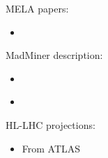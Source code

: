 \documentclass[11pt,letterpaper]{article}
\begin{document}
MELA papers:
\begin{itemize}
  \item \cite{Bolognesi:2012mm}
\end{itemize}

MadMiner description:
\begin{itemize}
  \item \cite{Brehmer:2018eca}
  \item \cite{Brehmer:2018hga}
\end{itemize}

HL-LHC projections:
\begin{itemize}
  \item \cite{ATL-PHYS-PUB-2015-024} From ATLAS
\end{itemize}



\end{document}
